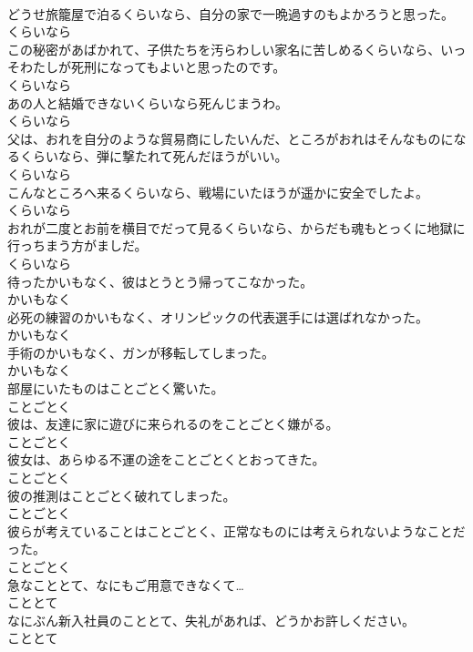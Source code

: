 \documentclass[8pt]{extreport}
\begin{document}
\begin{CJK}{UTF8}{min}
\\	どうせ旅籠屋で泊るくらいなら、自分の家で一晩過すのもよかろうと思った。	
\\	くらいなら	
\\	この秘密があばかれて、子供たちを汚らわしい家名に苦しめるくらいなら、いっそわたしが死刑になってもよいと思ったのです。	
\\	くらいなら	
\\	あの人と結婚できないくらいなら死んじまうわ。	
\\	くらいなら	
\\	父は、おれを自分のような貿易商にしたいんだ、ところがおれはそんなものになるくらいなら、弾に撃たれて死んだほうがいい。	
\\	くらいなら	
\\	こんなところへ来るくらいなら、戦場にいたほうが遥かに安全でしたよ。	
\\	くらいなら	
\\	おれが二度とお前を横目でだって見るくらいなら、からだも魂もとっくに地獄に行っちまう方がましだ。	
\\	くらいなら	
\\	待ったかいもなく、彼はとうとう帰ってこなかった。	
\\	かいもなく	
\\	必死の練習のかいもなく、オリンピックの代表選手には選ばれなかった。	
\\	かいもなく	
\\	手術のかいもなく、ガンが移転してしまった。	
\\	かいもなく	
\\	部屋にいたものはことごとく驚いた。	
\\	ことごとく	
\\	彼は、友達に家に遊びに来られるのをことごとく嫌がる。	
\\	ことごとく	
\\	彼女は、あらゆる不運の途をことごとくとおってきた。	
\\	ことごとく	
\\	彼の推測はことごとく破れてしまった。	
\\	ことごとく	
\\	彼らが考えていることはことごとく、正常なものには考えられないようなことだった。	
\\	ことごとく	
\\	急なこととて、なにもご用意できなくて…	
\\	こととて	
\\	なにぶん新入社員のこととて、失礼があれば、どうかお許しください。	
\\	こととて	

\end{CJK}
\end{document}
